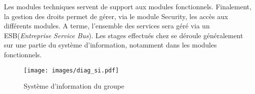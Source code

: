 Les modules techniques servent de support aux modules fonctionnels.
Finalement, la gestion des droits permet de gérer, via le module Security, les accès aux différents modules.
A terme, l'ensemble des services sera géré via un ESB(\textit{Entreprise Service Bus}).
Les stages effectués chez \ebi{} se déroule généralement sur une partie du système d'information, notamment dans les modules fonctionnels.

\begin{figure}[H]
	\centering
	\texttt{[image: images/diag\_si.pdf]}
	\caption{Système d'information du groupe \excilys{}}
\end{figure}
